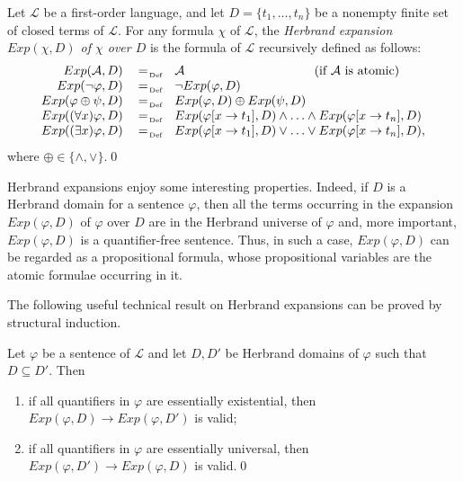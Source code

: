 \documentclass[a4paper]{llncs}
\newcommand{\Lang}{\ensuremath{\mathcal{L}\xspace}} %
\newcommand{\HExp}{Exp}
\newcommand{\subst}[3]{#1[#2\rightarrow#3]}
\begin{document}
\begin{definition}\label{EXP}
Let $\Lang$ be a first-order language, and let $D=\{t_1, \ldots, 
t_n\}$ be a nonempty finite set of closed terms of $\Lang$. For any 
formula $\chi$ of $\Lang$, the \emph{Herbrand expansion  $\HExp(\chi, 
D)$ of $\chi$ over $D$} is the formula of $\Lang$ recursively defined 
as follows:
\[
  \begin{array}{rcll}
  \HExp(\mathcal{A}, D) & \defAs & 
\mathcal{A}\qquad\qquad\qquad\qquad~\qquad\text{(if $\mathcal{A}$ is 
atomic)}  \\
  \HExp(\neg \varphi, D) & \defAs & \neg\HExp(\varphi, D) \\
  \HExp(\varphi \oplus \psi, D) & \defAs & \HExp(\varphi, D) \oplus 
\HExp(\psi, D)\\
  \HExp((\forall x)\varphi, D) & \defAs & 
\HExp(\subst{\varphi}{x}{t_1}, D) \wedge \ldots \wedge 
\HExp(\subst{\varphi}{x}{t_n}, D)\\
  \HExp((\exists x)\varphi, D) & \defAs & \HExp(\subst{\varphi}{x}{t_1}, D) \vee 
\ldots \vee \HExp(\subst{\varphi}{x}{t_n}, D),\\
  \end{array}
\]
where $\oplus \in \{\wedge, \vee\}$.\qed
\end{definition}

Herbrand expansions enjoy some interesting properties. Indeed, if $D$ 
is a Herbrand domain for a sentence $\varphi$, then all the terms 
occurring in the expansion $\HExp(\varphi, D)$ of
$\varphi$ over $D$ are in the Herbrand universe of $\varphi$ and, more
important, $\HExp(\varphi, D)$ is a
quantifier-free sentence.
Thus, in such a case, $\HExp(\varphi, D)$ can be regarded as a propositional
formula, whose propositional variables are the atomic formulae occurring in it.

The following useful technical result on Herbrand expansions can be 
proved by structural induction.
\begin{lemma}\label{le:Exp}
Let $\varphi$ be a sentence of $\Lang$ and let $D, D'$ be Herbrand 
domains of $\varphi$ such that $D \subseteq D'$. Then
\begin{enumerate}[label=(\alph*)]
\item\label{le:Expa} if all quantifiers in $\varphi$ are essentially 
existential, then $\HExp(\varphi, D) \rightarrow \HExp(\varphi, D')$ 
is valid;

\item\label{le:Expb} if all quantifiers in $\varphi$ are essentially 
universal, then $\HExp(\varphi, D') \rightarrow \HExp(\varphi, D)$ is 
valid.\qed
\end{enumerate}
\end{lemma}
\end{document}
